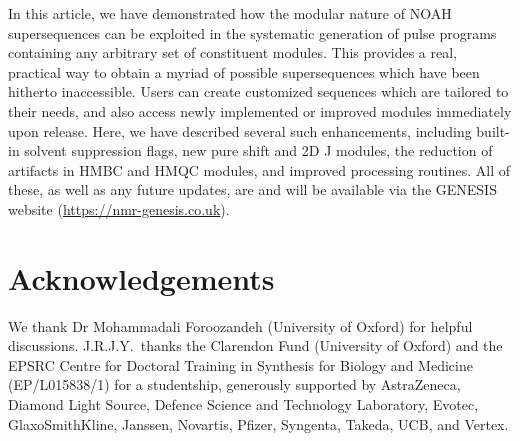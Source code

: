 \documentclass[a4paper,11pt]{article}
\newcommand{\theurl}{\url{https://nmr-genesis.co.uk}}
\begin{document}
\begin{refsection}
In this article, we have demonstrated how the modular nature of NOAH supersequences can be exploited in the systematic generation of pulse programs containing any arbitrary set of constituent modules.
This provides a real, practical way to obtain a myriad of possible supersequences which have been hitherto inaccessible.
Users can create customized sequences which are tailored to their needs, and also access newly implemented or improved modules immediately upon release.
Here, we have described several such enhancements, including built-in solvent suppression flags, new pure shift and 2D J modules, the reduction of artifacts in HMBC and HMQC modules, and improved processing routines.
All of these, as well as any future updates, are and will be available via the GENESIS website (\theurl{}).

\section*{Acknowledgements}

We thank Dr Mohammadali Foroozandeh (University of Oxford) for helpful discussions.
J.R.J.Y.\ thanks the Clarendon Fund (University of Oxford) and the EPSRC Centre for Doctoral Training in Synthesis for Biology and Medicine (EP/L015838/1) for a studentship, generously supported by AstraZeneca, Diamond Light Source, Defence Science and Technology Laboratory, Evotec, GlaxoSmithKline, Janssen, Novartis, Pfizer, Syngenta, Takeda, UCB, and Vertex.

\AtNextBibliography{\small}
\printbibliography{}
\end{refsection}
\end{document}
